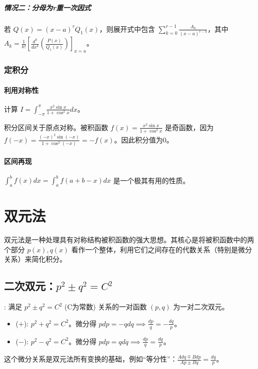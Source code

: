 \documentclass[lang=cn,newtx,10pt,scheme=chinese]{elegantbook}
\renewcommand{\textbf}[1]{\text{\heiti #1}}
\begin{document}
\paragraph{情况二：分母为r重一次因式}
若 $Q(x) = (x-a)^r Q_1(x)$，则展开式中包含 $\sum_{k=0}^{r-1} \frac{A_k}{(x-a)^{r-k}}$，其中 $A_k = \frac{1}{k!} \left[ \frac{d^k}{dx^k} \left( \frac{P(x)}{Q_1(x)} \right) \right]_{x=a}$。

\subsection{定积分}
\subsubsection{利用对称性}
\begin{problem}[CMC真题]
    计算 $I=\int_{-\pi}^{\pi} \frac{x^2 \sin x}{1+\cos^2 x} dx$。
\end{problem}
\begin{solution}
    积分区间关于原点对称。被积函数 $f(x) = \frac{x^2 \sin x}{1+\cos^2 x}$ 是奇函数，因为 $f(-x) = \frac{(-x)^2 \sin(-x)}{1+\cos^2(-x)} = -f(x)$。因此积分值为0。
\end{solution}

\subsubsection{区间再现}
$\int_a^b f(x)dx = \int_a^b f(a+b-x)dx$ 是一个极其有用的性质。

\chapter{双元法}
双元法是一种处理具有对称结构被积函数的强大思想。其核心是将被积函数中的两个部分 $p(x), q(x)$ 看作一个整体，利用它们之间存在的代数关系（特别是微分关系）来简化积分。

\section{二次双元：$p^2 \pm q^2 = C^2$}
\textbf{定义}: 满足 $p^2 \pm q^2 = C^2$ (C为常数) 关系的一对函数 $(p, q)$ 为一对二次双元。
\begin{itemize}
    \item \textbf{实圆关系} ($+$): $p^2 + q^2 = C^2$。微分得 $pdp = -qdq \implies \frac{dp}{q} = -\frac{dq}{p}$。
    \item \textbf{虚圆关系} ($-$): $p^2 - q^2 = C^2$。微分得 $pdp = qdq \implies \frac{dp}{q} = \frac{dq}{p}$。
\end{itemize}
这个微分关系是双元法所有变换的基础，例如“等分性”：$\frac{A dq \mp B dp}{Ap \pm Bq} = \frac{dq}{p}$。
\end{document}
